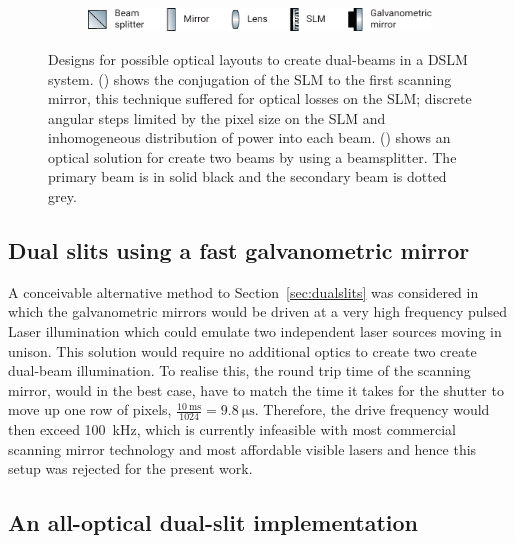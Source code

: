 \begin{figure}
    \vspace{\abovecaptionskip}
    \begin{subfigure}[t]{\textwidth}
        \centering
         \includegraphics{dual_beam_layout/key}
    \end{subfigure}
    \caption[Designs for each optical layout to create dual-beams in a light sheet system]{Designs for possible optical layouts to create dual-beams in a \gls{DSLM} system.
    () shows the conjugation of the \gls{SLM} to the first scanning mirror, this technique suffered for optical losses on the \gls{SLM}; discrete angular steps limited by the pixel size on the \gls{SLM} and inhomogeneous distribution of power into each beam.
    () shows an optical solution for create two beams by using a beamsplitter.
    The primary beam is in solid black and the secondary beam is dotted grey.
    }
    \label{fig:dual_beam_layouts}
\end{figure}

\subsection{Dual slits using a fast galvanometric mirror}

A conceivable alternative method to Section~\ref{sec:dualslits} was considered in which
the galvanometric mirrors would be driven at a very high frequency pulsed \gls{Laser} illumination which
could emulate two independent laser sources moving in unison.
This solution would require no additional optics to create two create dual-beam illumination.
To realise this, the round trip time of the scanning mirror, would in the best case, have to match the time it takes for the shutter to move up one row of pixels, \(\frac{\SI{10}{\milli\second}}{1024}=\SI{9.8}{\micro\second}\).
Therefore, the drive frequency would then exceed \SI{100}{\kilo\hertz}, which is currently infeasible with most commercial scanning mirror technology and most affordable visible lasers and hence this setup was rejected for the present work.

\subsection{An all-optical dual-slit implementation}

